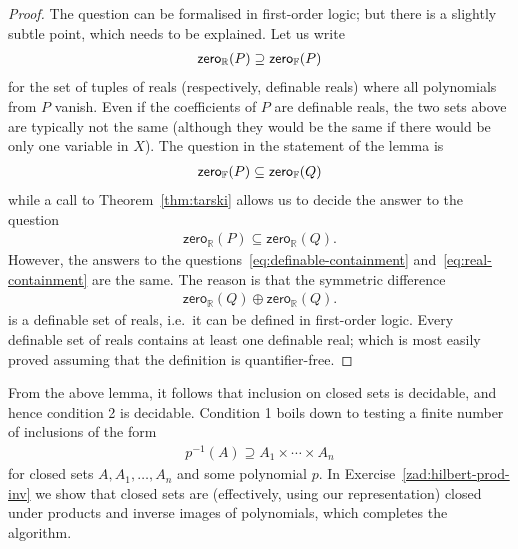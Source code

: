 \begin{proof}
The question can be formalised in first-order logic; but  there is a slightly subtle point, which needs to be explained.  Let us write 
\begin{align*}
  \mathsf{zero}_{\mathbb R}(P) \supseteq \mathsf{zero}_{\mathbb F}(P)
\end{align*}
for the set of tuples of reals (respectively, definable reals) where all polynomials from $P$ vanish. Even if the coefficients of $P$ are definable reals, the two sets above are typically not the same (although they would be the same if there would be only one variable in $X$). The question in the statement of the lemma is 
\begin{align}\label{eq:definable-containment}
 \mathsf{zero}_{\mathbb F}(P)  \subseteq \mathsf{zero}_{\mathbb F}(Q)
\end{align}
while a call to Theorem~\ref{thm:tarski} allows us to decide the answer to the question
\begin{align}\label{eq:real-containment}
 \mathsf{zero}_{\mathbb R}(P)  \subseteq \mathsf{zero}_{\mathbb R}(Q).
\end{align}
However, the answers to the questions~\eqref{eq:definable-containment} and~\eqref{eq:real-containment} are the same. The reason is that the symmetric difference  
\begin{align*}
   \mathsf{zero}_{\mathbb R}(Q) \oplus   \mathsf{zero}_{\mathbb R}(Q).
\end{align*}
is a definable set of reals, i.e.~it can be defined in first-order logic. Every definable set of reals contains at least one definable real; which is most easily proved assuming that the definition is quantifier-free.
\end{proof}

From the above lemma, it follows that inclusion  on closed sets is decidable, and hence condition 2 is decidable.   Condition 1 boils down to testing a finite number of inclusions of the form
  \begin{align*}
p^{-1}(A) \supseteq A_1 \times \cdots \times A_n	
\end{align*}
for closed sets $A,A_1,\ldots,A_n$ and some polynomial $p$.  In Exercise~\ref{zad:hilbert-prod-inv} we show that closed sets are (effectively, using our representation) closed under products  and inverse images of polynomials, which completes the algorithm. 
  
  





